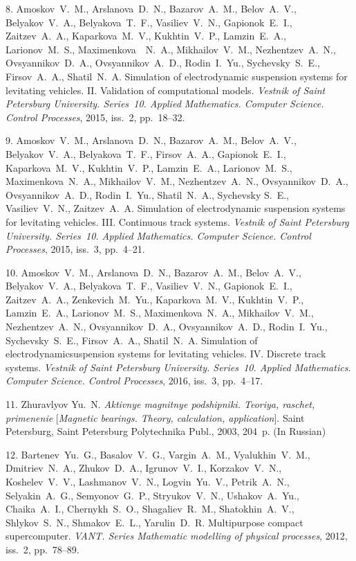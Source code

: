 {8. Amoskov~V.~M., Arslanova~D.~N., Bazarov~A.~M., Belov~A.~V.,
Belyakov~V.~A., Belyakova~T.~F., Vasiliev~V.~N., Gapionok~E.~I.,
Zaitzev~A.~A., Kaparkova~M.~V., Kukhtin~V.~P., Lamzin~E.~A.,
Larionov~M.~S., Maximenkova~~N.~A., Mikhailov~V.~M.,
Nezhentzev~A.~N., Ovsyannikov~D.~A., Ovsyan\-nikov~A.~D.,
Rodin~I.~Yu., Sychevsky~S.~E., Firsov~A.~A., Shatil~N.~A.
Simulation of electrodynamic suspension systems for levitating
vehicles. II. Validation of computational models. {\em Vestnik of
Saint Petersburg University. Series~10. Applied Mathematics.
Computer Science. Control Processes}, 2015, iss.~2, pp.~18--32.

9. Amoskov~V.~M., Arslanova~D.~N., Bazarov~A.~M., Belov~A.~V.,
Belyakov~V.~A., Belyakova~T.~F., Firsov~A.~A., Gapionok~E.~I.,
Kaparkova~M.~V., Kukhtin~V.~P., Lamzin~E.~A., Larionov~M.~S.,
Maximenkova~N.~A., Mikhailov~V.~M., Nezhentzev~A.~N.,
Ovsyannikov~D.~A., Ovsyannikov~A.~D., Rodin~I.~Yu., Shatil~N.~A.,
Sychevsky S.~E., Vasiliev~V.~N., Zaitzev~A.~A. Simulation of
electrodynamic suspension systems for levitating vehicles. III.
Continuous track systems. {\em Vestnik of Saint Petersburg
University. Series~10. Applied Mathematics. Computer Science.
Control Processes}, 2015, iss.~3, pp.~4--21.

10. Amoskov~V.~M., Arslanova~D.~N., Bazarov~A.~M., Belov~A.~V.,
Belyakov~V.~A., Belyakova~T.~F., Vasiliev~V.~N., Gapionok~E.~I.,
Zaitzev~A.~A., Zenkevich~M.~Yu., Kaparkova~M.~V., Kukhtin~V.~P.,
Lamzin~E.~A., Larionov~M.~S., Maximenkova~N.~A., Mikhailov~V.~M.,
Nezhentzev~A.~N., Ovsyannikov~D.~A., Ovsyannikov~A.~D.,
Rodin~I.~Yu., Sychevsky~S.~E., Firsov~A.~A., Shatil~N.~A.
Simulation of electrodynamic\linebreak\newpage\noindent suspension
systems for levitating vehicles. IV. Discrete track systems. {\em
Vestnik of Saint Petersburg University. Series~10. Applied
Mathematics. Computer Science. Control Processes}, 2016, iss.~3,
pp.~4--17.

11. Zhuravlyov Yu.~N. {\em Aktivnye magnitnye podshipniki.
Teoriya, raschet, primenenie} [{\em Magnetic bearings. Theory,
calculation, application}]. Saint Petersburg, Saint Petersburg
Polytechnika Publ., 2003, 204~p. (In Russian)

12. Bartenev~Yu.~G., Basalov~V.~G., Vargin~A.~M., Vyalukhin~V.~M.,
Dmitriev~N.~A., Zhukov~D.~A., Igrunov~V.~I., Korzakov~V.~N.,
Koshelev~V.~V., Lashmanov~V.~N., Logvin~Yu.~V., Petrik~A.~N.,
Selyakin~A.~G., Semyonov~G.~P., Stryukov~V.~N., Ushakov~A.~Yu.,
Chaika~A.~I., Chernykh~S.~O., Shagaliev~R.~M., Shatokhin~A.~V.,
Shlykov~S.~N., Shmakov~E.~L., Yarulin~D.~R. Multipurpose compact
supercomputer. {\em VANT. Series Mathematic modelling of physical
processes}, 2012, iss.~2, pp.~78--89.

}

